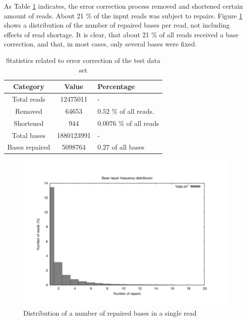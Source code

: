 As Table \ref{tab:test-correction} indicates, the error correction process removed and shortened certain amount of reads. About 21 \% of the input reads was subject to repairs. Figure \ref{fig:test-repair-frequency} shows a distribution of the number of repaired bases per read, not including effects of read shortage. It is clear, that about 21 \% of all reads received a base correction, and that, in most cases, only several bases were fixed. 

\begin{table}[h]
\begin{center}
\caption{Statistics related to error correction of the test data set}
\label{tab:test-correction}
\begin{tabular}{| c | c | p{5cm} |}
\hline
Category & Value & Percentage \\
\hline
Total reads & 12475011 & - \\
\hline
Removed & 64653 &  $0.52$ \% of all reads. \\
\hline
Shortened & 944 & $0.0076$ \% of all reads \\
\hline
Total bases & 1880123991 & - \\
\hline
Bases repaired & 5098764 &  $0.27$ of all bases \\
\hline
\end{tabular}
\end{center}
\end{table}

\begin{figure}[h]
	\centering
	\includegraphics{img/test-repair-frequency.pdf}
	\caption{Distribution of a number of repaired bases in a single read}
	\label{fig:test-repair-frequency}
\end{figure}

